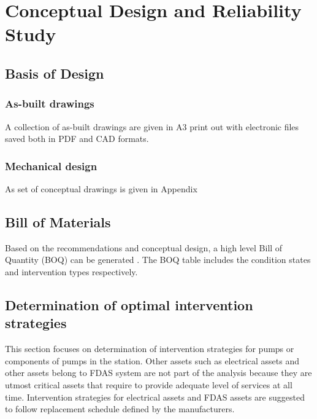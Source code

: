 \chapter{Conceptual Design and Reliability Study} %
\label{Chapter6}
%
\section{Basis of Design}
\subsection{As-built drawings}
A collection of as-built drawings are given in A3 print out with electronic files saved both in PDF and CAD formats.
\subsection{Mechanical design}
As set of conceptual drawings is given in Appendix %


%
\section{Bill of Materials}
Based on the recommendations and conceptual design, a high level Bill of Quantity (BOQ) can be generated . The BOQ table includes the condition states and intervention types respectively. %


\section{Determination of optimal intervention strategies}

This section focuses on determination of intervention strategies for pumps or components of pumps in the station. Other assets such as electrical assets and other assets belong to FDAS system are not part of the analysis because they are utmost critical assets that require to provide adequate level of services at all time. Intervention strategies for electrical assets and FDAS assets are suggested to follow replacement schedule defined by the manufacturers.
%
